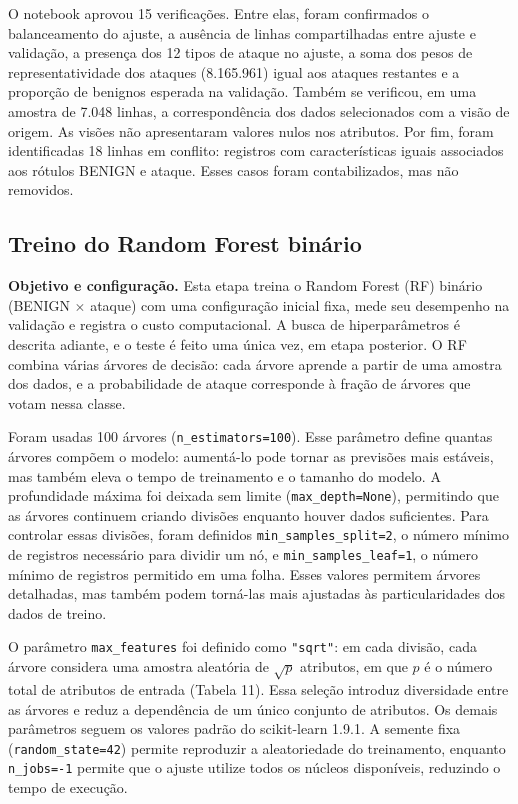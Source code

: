 \documentclass[
    12pt,                %
    openright,           %
    oneside,             %
    a4paper,             %
    english,             %
    brazil               %
]{abntex2}
\begin{document}
O notebook aprovou 15 verificações. Entre elas, foram confirmados o balanceamento do ajuste, a ausência de linhas compartilhadas entre ajuste e validação, a presença dos 12 tipos de ataque no ajuste, a soma dos pesos de representatividade dos ataques (8.165.961) igual aos ataques restantes e a proporção de benignos esperada na validação. Também se verificou, em uma amostra de 7.048 linhas, a correspondência dos dados selecionados com a visão de origem. As visões não apresentaram valores nulos nos atributos. Por fim, foram identificadas 18 linhas em conflito: registros com características iguais associados aos rótulos BENIGN e ataque. Esses casos foram contabilizados, mas não removidos.

\subsection{Treino do Random Forest binário}

\textbf{Objetivo e configuração.} Esta etapa treina o Random Forest (RF) binário (BENIGN $\times$ ataque) com uma configuração inicial fixa, mede seu desempenho na validação e registra o custo computacional. A busca de hiperparâmetros é descrita adiante, e o teste é feito uma única vez, em etapa posterior. O RF combina várias árvores de decisão: cada árvore aprende a partir de uma amostra dos dados, e a probabilidade de ataque corresponde à fração de árvores que votam nessa classe.

Foram usadas 100 árvores (\texttt{n\_estimators=100}). Esse parâmetro define quantas árvores compõem o modelo: aumentá-lo pode tornar as previsões mais estáveis, mas também eleva o tempo de treinamento e o tamanho do modelo. A profundidade máxima foi deixada sem limite (\texttt{max\_depth=None}), permitindo que as árvores continuem criando divisões enquanto houver dados suficientes. Para controlar essas divisões, foram definidos \texttt{min\_samples\_split=2}, o número mínimo de registros necessário para dividir um nó, e \texttt{min\_samples\_leaf=1}, o número mínimo de registros permitido em uma folha. Esses valores permitem árvores detalhadas, mas também podem torná-las mais ajustadas às particularidades dos dados de treino.

O parâmetro \texttt{max\_features} foi definido como \texttt{"sqrt"}: em cada divisão, cada árvore considera uma amostra aleatória de \(\sqrt{p}\) atributos, em que \(p\) é o número total de atributos de entrada (Tabela 11). Essa seleção introduz diversidade entre as árvores e reduz a dependência de um único conjunto de atributos. Os demais parâmetros seguem os valores padrão do scikit-learn 1.9.1. A semente fixa (\texttt{random\_state=42}) permite reproduzir a aleatoriedade do treinamento, enquanto \texttt{n\_jobs=-1} permite que o ajuste utilize todos os núcleos disponíveis, reduzindo o tempo de execução.
\end{document}
